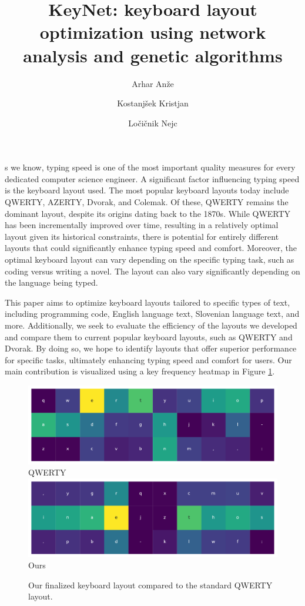 \documentclass[9pt,twocolumn,twoside]{pnas-report}
\title{KeyNet: keyboard layout optimization using network analysis and genetic algorithms}
\author[a,1]{Arhar Anže}
\author[a]{Kostanjšek Kristjan}
\author[a]{Ločičnik Nejc}
\affil[a]{University of Ljubljana, Faculty of Computer and Information Science, Ve\v{c}na pot 113, SI-1000 Ljubljana, Slovenia}
\begin{document}
\maketitle
\thispagestyle{firststyle}

s we know, typing speed is one of the most important quality measures for every dedicated computer science engineer.
A significant factor influencing typing speed is the keyboard layout used.
The most popular keyboard layouts today include QWERTY, AZERTY, Dvorak, and Colemak.
Of these, QWERTY remains the dominant layout, despite its origins dating back to the 1870s.
While QWERTY has been incrementally improved over time, resulting in a relatively optimal layout given its historical constraints, there is potential for entirely different layouts that could significantly enhance typing speed and comfort.
Moreover, the optimal keyboard layout can vary depending on the specific typing task, such as coding versus writing a novel.
The layout can also vary significantly depending on the language being typed.

This paper aims to optimize keyboard layouts tailored to specific types of text, including programming code, English language text, Slovenian language text, and more.
Additionally, we seek to evaluate the efficiency of the layouts we developed and compare them to current popular keyboard layouts, such as QWERTY and Dvorak.
By doing so, we hope to identify layouts that offer superior performance for specific tasks, ultimately enhancing typing speed and comfort for users.
Our main contribution is visualized using a key frequency heatmap in Figure \ref{fig:main_contributions}.

\begin{figure}[t]\centering%
    \includegraphics[width=0.8\linewidth]{fig/qwerty}\\
    \small{QWERTY}
    \vskip5pt
    \includegraphics[width=0.8\linewidth]{fig/genetic}\\
    \small{Ours}
    \caption{Our finalized keyboard layout compared to the standard QWERTY layout.}
    \label{fig:main_contributions}
\end{figure}
\end{document}
